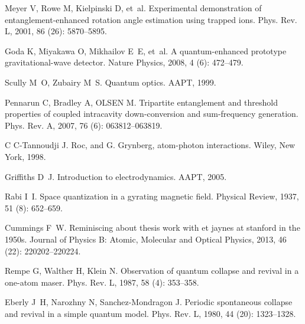 \begin{thebibliography}{113}
	Meyer V, Rowe M, Kielpinski D, et~al.
	\newblock Experimental demonstration of entanglement-enhanced rotation angle
	estimation using trapped ions\allowbreak[J].
	\newblock Phys. Rev. L, 2001, 86 (26): 5870--5895.
	
	Goda K, Miyakawa O, Mikhailov E~E, et~al.
	\newblock A quantum-enhanced prototype gravitational-wave
	detector\allowbreak[J].
	\newblock Nature Physics, 2008, 4 (6): 472--479.
	
	Scully M~O, Zubairy M~S.
	\newblock Quantum optics\allowbreak[Z]. AAPT, 1999.
	
	Pennarun C, Bradley A, OLSEN M.
	\newblock Tripartite entanglement and threshold properties of coupled
	intracavity down-conversion and sum-frequency generation\allowbreak[J].
	\newblock Phys. Rev. A, 2007, 76 (6): 063812--063819.
	
	C C-Tannoudji J.
	\newblock Roc, and G. Grynberg, atom-photon interactions\allowbreak[Z]. Wiley, New York, 1998.
	
	Griffiths D~J.
	\newblock Introduction to electrodynamics\allowbreak[Z]. AAPT, 2005.
	
	Rabi I~I.
	\newblock Space quantization in a gyrating magnetic field\allowbreak[J].
	\newblock Physical Review, 1937, 51 (8): 652--659.
	
	Cummings F~W.
	\newblock Reminiscing about thesis work with et jaynes at stanford in the
	1950s\allowbreak[J].
	\newblock Journal of Physics B: Atomic, Molecular and Optical Physics, 2013,
	46 (22): 220202--220224.
	
	Rempe G, Walther H, Klein N.
	\newblock Observation of quantum collapse and revival in a one-atom
	maser\allowbreak[J].
	\newblock Phys. Rev. L, 1987, 58 (4): 353--358.
	
	Eberly J~H, Narozhny N, Sanchez-Mondragon J.
	\newblock Periodic spontaneous collapse and revival in a simple quantum
	model\allowbreak[J].
	\newblock Phys. Rev. L, 1980, 44 (20): 1323--1328.
	

\end{thebibliography}
